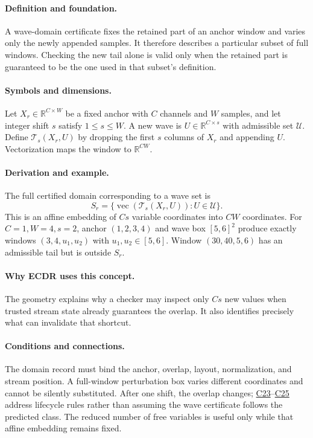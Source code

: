 \documentclass[11pt,a4paper]{article}
\newcommand{\R}{\mathbb R}
\begin{document}
\paragraph{Definition and foundation.}
A wave-domain certificate fixes the retained part of an anchor window and varies only the newly appended samples. It therefore describes a particular subset of full windows. Checking the new tail alone is valid only when the retained part is guaranteed to be the one used in that subset's definition.
\paragraph{Symbols and dimensions.}
Let $X_r\in\R^{C\times W}$ be a fixed anchor with $C$ channels and $W$ samples, and let integer shift $s$ satisfy $1\le s\le W$. A new wave is $U\in\R^{C\times s}$ with admissible set $\mathcal U$. Define $\mathcal T_s(X_r,U)$ by dropping the first $s$ columns of $X_r$ and appending $U$. Vectorization maps the window to $\R^{CW}$.
\paragraph{Derivation and example.}
The full certified domain corresponding to a wave set is
\[
 S_r=\{\operatorname{vec}(\mathcal T_s(X_r,U)):U\in\mathcal U\}.
\]
This is an affine embedding of $Cs$ variable coordinates into $CW$ coordinates. For $C=1,W=4,s=2$, anchor $(1,2,3,4)$ and wave box $[5,6]^2$ produce exactly windows $(3,4,u_1,u_2)$ with $u_1,u_2\in[5,6]$. Window $(30,40,5,6)$ has an admissible tail but is outside $S_r$.
\paragraph{Why ECDR uses this concept.}
The geometry explains why a checker may inspect only $Cs$ new values when trusted stream state already guarantees the overlap. It also identifies precisely what can invalidate that shortcut.
\paragraph{Conditions and connections.}
The domain record must bind the anchor, overlap, layout, normalization, and stream position. A full-window perturbation box varies different coordinates and cannot be silently substituted. After one shift, the overlap changes; \hyperref[concept:C23]{C23}--\hyperref[concept:C25]{C25} address lifecycle rules rather than assuming the wave certificate follows the predicted class. The reduced number of free variables is useful only while that affine embedding remains fixed.
\par\label{endconcept:C17}
\end{document}
